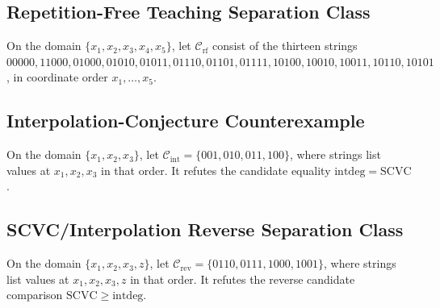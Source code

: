   \subsection{Repetition-Free Teaching Separation Class}\label{cl:repetitionfree_teaching_separation}
  \begin{definition}
  On the domain $\{x_1,x_2,x_3,x_4,x_5\}$, let
  $\mathcal C_{\mathrm{rf}}$ consist of the thirteen strings
  $00000,11000,01000,01010,01011,01110,01101,01111,10100,10010,10011,10110,10101$,
  in coordinate order $x_1,\ldots,x_5$.
  \end{definition}

  \subsection{Interpolation-Conjecture Counterexample}\label{cl:interpolation_conjecture_counterexample}
  \begin{definition}
  On the domain $\{x_1,x_2,x_3\}$, let
  $\mathcal C_{\mathrm{int}}=\{001,010,011,100\}$, where strings list values
  at $x_1,x_2,x_3$ in that order.  It refutes the candidate equality
  $\mathrm{intdeg}=\mathrm{SCVC}$.
  \end{definition}

  \subsection{SCVC/Interpolation Reverse Separation Class}\label{cl:scvc_interpolation_reverse_separation}
  \begin{definition}
  On the domain $\{x_1,x_2,x_3,z\}$, let
  $\mathcal C_{\mathrm{rev}}=\{0110,0111,1000,1001\}$, where strings list
  values at $x_1,x_2,x_3,z$ in that order.  It refutes the reverse candidate
  comparison $\mathrm{SCVC}\geq\mathrm{intdeg}$.
  \end{definition}
